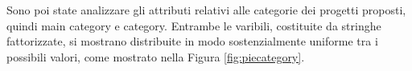 \begin{figure}%
	\centering
	\qquad
	\caption{}%
	\label{fig:countrygdp}%
\end{figure}

Sono poi state analizzare gli attributi relativi alle categorie dei progetti proposti, quindi main category e category. Entrambe le varibili, costituite da stringhe fattorizzate, si mostrano distribuite in modo sostenzialmente uniforme tra i possibili valori, come mostrato nella Figura \ref{fig:piecategory}. 

